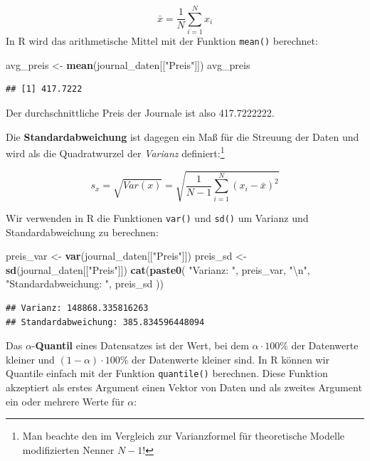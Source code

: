 \documentclass[]{book}
\newenvironment{Shaded}{\begin{snugshade}}{\end{snugshade}}
\newcommand{\KeywordTok}[1]{\textcolor[rgb]{0.13,0.29,0.53}{\textbf{#1}}}
\newcommand{\CharTok}[1]{\textcolor[rgb]{0.31,0.60,0.02}{#1}}
\newcommand{\StringTok}[1]{\textcolor[rgb]{0.31,0.60,0.02}{#1}}
\newcommand{\NormalTok}[1]{#1}
\let\rmarkdownfootnote\footnote%
\def\footnote{\protect\rmarkdownfootnote}
\begin{document}
\[\bar{x}=\frac{1}{N}\sum_{i=1}^Nx_i\] In R wird das arithmetische
Mittel mit der Funktion \texttt{mean()} berechnet:

\begin{Shaded}
\begin{Highlighting}[]
\NormalTok{avg_preis <-}\StringTok{ }\KeywordTok{mean}\NormalTok{(journal_daten[[}\StringTok{"Preis"}\NormalTok{]])}
\NormalTok{avg_preis}
\end{Highlighting}
\end{Shaded}

\begin{verbatim}
## [1] 417.7222
\end{verbatim}

Der durchschnittliche Preis der Journale ist also 417.7222222.

Die \textbf{Standardabweichung} ist dagegen ein Maß für die Streuung der
Daten und wird als die Quadratwurzel der \emph{Varianz}
definiert:\footnote{Man beachte den im Vergleich zur Varianzformel für
  theoretische Modelle modifizierten Nenner \(N-1\)!}

\[s_x=\sqrt{Var(x)}=\sqrt{\frac{1}{N-1}\sum_{i=1}^N\left(x_i-\bar{x}\right)^2}\]

Wir verwenden in R die Funktionen \texttt{var()} und \texttt{sd()} um
Varianz und Standardabweichung zu berechnen:

\begin{Shaded}
\begin{Highlighting}[]
\NormalTok{preis_var <-}\StringTok{ }\KeywordTok{var}\NormalTok{(journal_daten[[}\StringTok{"Preis"}\NormalTok{]])}
\NormalTok{preis_sd <-}\StringTok{ }\KeywordTok{sd}\NormalTok{(journal_daten[[}\StringTok{"Preis"}\NormalTok{]])}
\KeywordTok{cat}\NormalTok{(}\KeywordTok{paste0}\NormalTok{(}
  \StringTok{"Varianz: "}\NormalTok{, preis_var, }\StringTok{"}\CharTok{\textbackslash{}n}\StringTok{"}\NormalTok{,}
  \StringTok{"Standardabweichung: "}\NormalTok{, preis_sd}
\NormalTok{))}
\end{Highlighting}
\end{Shaded}

\begin{verbatim}
## Varianz: 148868.335816263
## Standardabweichung: 385.834596448094
\end{verbatim}

Das \(\alpha\)-\textbf{Quantil} eines Datensatzes ist der Wert, bei dem
\(\alpha\cdot 100\%\) der Datenwerte kleiner und
\((1-\alpha)\cdot 100\%\) der Datenwerte kleiner sind. In R können wir
Quantile einfach mit der Funktion \texttt{quantile()} berechnen. Diese
Funktion akzeptiert als erstes Argument einen Vektor von Daten und als
zweites Argument ein oder mehrere Werte für \(\alpha\):
\end{document}
